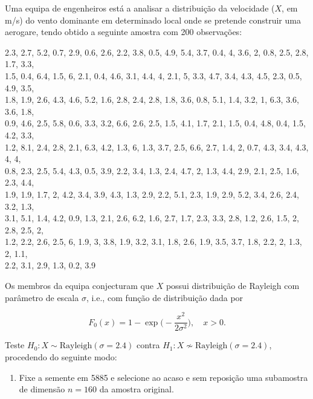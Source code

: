 \documentclass[11pt,a4paper]{article}
\begin{document}
\begin{tcolorbox}[colback=blue!5!white,colframe=blue!75!black,title=Teste de Ajustamento de Rayleigh - Exercício 10]

Uma equipa de engenheiros está a analisar a distribuição da velocidade ($X$, em m/s) do vento dominante em determinado local onde se pretende construir uma aerogare, tendo obtido a seguinte amostra com 200 observações:

\begin{small}
2.3, 2.7, 5.2, 0.7, 2.9, 0.6, 2.6, 2.2, 3.8, 0.5, 4.9, 5.4, 3.7, 0.4, 4, 3.6, 2, 0.8, 2.5, 2.8, 1.7, 3.3, \\
1.5, 0.4, 6.4, 1.5, 6, 2.1, 0.4, 4.6, 3.1, 4.4, 4, 2.1, 5, 3.3, 4.7, 3.4, 4.3, 4.5, 2.3, 0.5, 4.9, 3.5, \\
1.8, 1.9, 2.6, 4.3, 4.6, 5.2, 1.6, 2.8, 2.4, 2.8, 1.8, 3.6, 0.8, 5.1, 1.4, 3.2, 1, 6.3, 3.6, 3.6, 1.8, \\
0.9, 4.6, 2.5, 5.8, 0.6, 3.3, 3.2, 6.6, 2.6, 2.5, 1.5, 4.1, 1.7, 2.1, 1.5, 0.4, 4.8, 0.4, 1.5, 4.2, 3.3, \\
1.2, 8.1, 2.4, 2.8, 2.1, 6.3, 4.2, 1.3, 6, 1.3, 3.7, 2.5, 6.6, 2.7, 1.4, 2, 0.7, 4.3, 3.4, 4.3, 4, 4, \\
0.8, 2.3, 2.5, 5.4, 4.3, 0.5, 3.9, 2.2, 3.4, 1.3, 2.4, 4.7, 2, 1.3, 4.4, 2.9, 2.1, 2.5, 1.6, 2.3, 4.4, \\
1.9, 1.9, 1.7, 2, 4.2, 3.4, 3.9, 4.3, 1.3, 2.9, 2.2, 5.1, 2.3, 1.9, 2.9, 5.2, 3.4, 2.6, 2.4, 3.2, 1.3, \\
3.1, 5.1, 1.4, 4.2, 0.9, 1.3, 2.1, 2.6, 6.2, 1.6, 2.7, 1.7, 2.3, 3.3, 2.8, 1.2, 2.6, 1.5, 2, 2.8, 2.5, 2, \\
1.2, 2.2, 2.6, 2.5, 6, 1.9, 3, 3.8, 1.9, 3.2, 3.1, 1.8, 2.6, 1.9, 3.5, 3.7, 1.8, 2.2, 2, 1.3, 2, 1.1, \\
2.2, 3.1, 2.9, 1.3, 0.2, 3.9
\end{small}

Os membros da equipa conjecturam que $X$ possui distribuição de Rayleigh com parâmetro de escala $\sigma$, i.e., com função de distribuição dada por

\[
F_{0}(x)=1-\exp\biggl(-\frac{x^{2}}{2\sigma^{2}}\biggr),\quad x>0.
\]

Teste $H_{0}:X\sim\text{Rayleigh}(\sigma=2.4)$ contra $H_{1}:X\nsim\text{Rayleigh}(\sigma=2.4)$, procedendo do seguinte modo:

\begin{enumerate}[label=\arabic*.]
    \item Fixe a semente em 5885 e selecione ao acaso e sem reposição uma subamostra de dimensão $n=160$ da amostra original.
    

\end{enumerate}
\end{tcolorbox}
\end{document}
